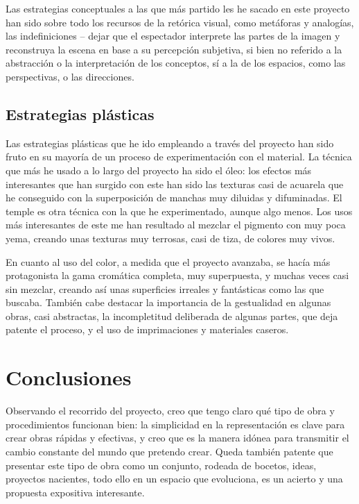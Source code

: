 Las estrategias conceptuales a las que más partido les he sacado en este
proyecto han sido sobre todo los recursos de la retórica visual, como
metáforas y analogías, las indefiniciones -- dejar que el espectador
interprete las partes de la imagen y reconstruya la escena en base a su
percepción subjetiva, si bien no referido a la abstracción o la
interpretación de los conceptos, sí a la de los espacios, como las
perspectivas, o las direcciones.

\hypertarget{estrategias-pluxe1sticas}{%
\subsection{Estrategias plásticas}\label{estrategias-pluxe1sticas}}

Las estrategias plásticas que he ido empleando a través del proyecto han
sido fruto en su mayoría de un proceso de experimentación con el
material. La técnica que más he usado a lo largo del proyecto ha sido el
óleo: los efectos más interesantes que han surgido con este han sido las
texturas casi de acuarela que he conseguido con la superposición de
manchas muy diluidas y difuminadas. El temple es otra técnica con la que
he experimentado, aunque algo menos. Los usos más interesantes de este
me han resultado al mezclar el pigmento con muy poca yema, creando unas
texturas muy terrosas, casi de tiza, de colores muy vivos.

En cuanto al uso del color, a medida que el proyecto avanzaba, se hacía
más protagonista la gama cromática completa, muy superpuesta, y muchas
veces casi sin mezclar, creando así unas superficies irreales y
fantásticas como las que buscaba. También cabe destacar la importancia
de la gestualidad en algunas obras, casi abstractas, la incompletitud
deliberada de algunas partes, que deja patente el proceso, y el uso de
imprimaciones y materiales caseros.

\hypertarget{conclusiones}{%
\section{Conclusiones}\label{conclusiones}}

Observando el recorrido del proyecto, creo que tengo claro qué tipo de
obra y procedimientos funcionan bien: la simplicidad en la
representación es clave para crear obras rápidas y efectivas, y creo que
es la manera idónea para transmitir el cambio constante del mundo que
pretendo crear. Queda también patente que presentar este tipo de obra
como un conjunto, rodeada de bocetos, ideas, proyectos nacientes, todo
ello en un espacio que evoluciona, es un acierto y una propuesta
expositiva interesante.

